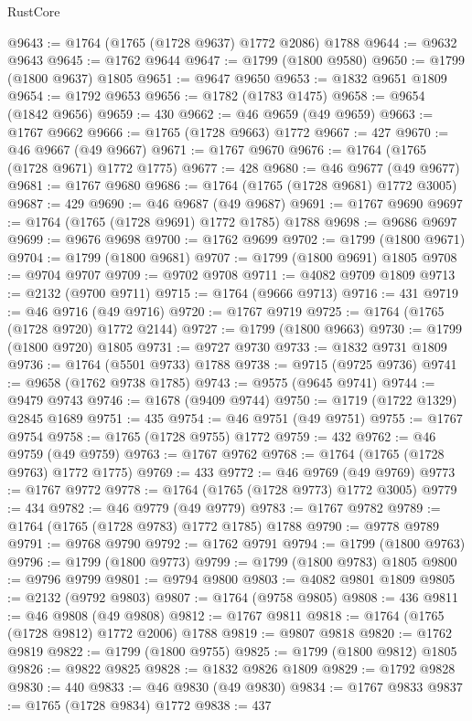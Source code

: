 \begin{lexlean}{RustCore}
\begin{coremodule}
@9643 := @1764 (@1765 (@1728 @9637) @1772 @2086) @1788
@9644 := @9632 @9643
@9645 := @1762 @9644
@9647 := @1799 (@1800 @9580)
@9650 := @1799 (@1800 @9637) @1805
@9651 := @9647 @9650
@9653 := @1832 @9651 @1809
@9654 := @1792 @9653
@9656 := @1782 (@1783 @1475)
@9658 := @9654 (@1842 @9656)
@9659 := 430
@9662 := @46 @9659 (@49 @9659)
@9663 := @1767 @9662
@9666 := @1765 (@1728 @9663) @1772
@9667 := 427
@9670 := @46 @9667 (@49 @9667)
@9671 := @1767 @9670
@9676 := @1764 (@1765 (@1728 @9671) @1772 @1775)
@9677 := 428
@9680 := @46 @9677 (@49 @9677)
@9681 := @1767 @9680
@9686 := @1764 (@1765 (@1728 @9681) @1772 @3005)
@9687 := 429
@9690 := @46 @9687 (@49 @9687)
@9691 := @1767 @9690
@9697 := @1764 (@1765 (@1728 @9691) @1772 @1785) @1788
@9698 := @9686 @9697
@9699 := @9676 @9698
@9700 := @1762 @9699
@9702 := @1799 (@1800 @9671)
@9704 := @1799 (@1800 @9681)
@9707 := @1799 (@1800 @9691) @1805
@9708 := @9704 @9707
@9709 := @9702 @9708
@9711 := @4082 @9709 @1809
@9713 := @2132 (@9700 @9711)
@9715 := @1764 (@9666 @9713)
@9716 := 431
@9719 := @46 @9716 (@49 @9716)
@9720 := @1767 @9719
@9725 := @1764 (@1765 (@1728 @9720) @1772 @2144)
@9727 := @1799 (@1800 @9663)
@9730 := @1799 (@1800 @9720) @1805
@9731 := @9727 @9730
@9733 := @1832 @9731 @1809
@9736 := @1764 (@5501 @9733) @1788
@9738 := @9715 (@9725 @9736)
@9741 := @9658 (@1762 @9738 @1785)
@9743 := @9575 (@9645 @9741)
@9744 := @9479 @9743
@9746 := @1678 (@9409 @9744)
@9750 := @1719 (@1722 @1329) @2845 @1689
@9751 := 435
@9754 := @46 @9751 (@49 @9751)
@9755 := @1767 @9754
@9758 := @1765 (@1728 @9755) @1772
@9759 := 432
@9762 := @46 @9759 (@49 @9759)
@9763 := @1767 @9762
@9768 := @1764 (@1765 (@1728 @9763) @1772 @1775)
@9769 := 433
@9772 := @46 @9769 (@49 @9769)
@9773 := @1767 @9772
@9778 := @1764 (@1765 (@1728 @9773) @1772 @3005)
@9779 := 434
@9782 := @46 @9779 (@49 @9779)
@9783 := @1767 @9782
@9789 := @1764 (@1765 (@1728 @9783) @1772 @1785) @1788
@9790 := @9778 @9789
@9791 := @9768 @9790
@9792 := @1762 @9791
@9794 := @1799 (@1800 @9763)
@9796 := @1799 (@1800 @9773)
@9799 := @1799 (@1800 @9783) @1805
@9800 := @9796 @9799
@9801 := @9794 @9800
@9803 := @4082 @9801 @1809
@9805 := @2132 (@9792 @9803)
@9807 := @1764 (@9758 @9805)
@9808 := 436
@9811 := @46 @9808 (@49 @9808)
@9812 := @1767 @9811
@9818 := @1764 (@1765 (@1728 @9812) @1772 @2006) @1788
@9819 := @9807 @9818
@9820 := @1762 @9819
@9822 := @1799 (@1800 @9755)
@9825 := @1799 (@1800 @9812) @1805
@9826 := @9822 @9825
@9828 := @1832 @9826 @1809
@9829 := @1792 @9828
@9830 := 440
@9833 := @46 @9830 (@49 @9830)
@9834 := @1767 @9833
@9837 := @1765 (@1728 @9834) @1772
@9838 := 437

\end{coremodule}
\end{lexlean}

